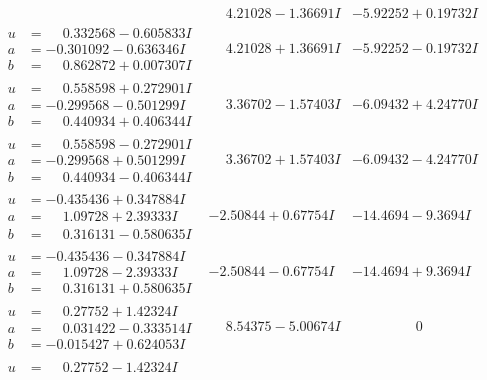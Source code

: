 \documentclass[1p]{elsarticle_modified}
\theoremstyle{definition}
\begin{document}
$$\begin{array}{c|c|c}
 & \phantom{-}4.21028 - 1.36691 I & -5.92252 + 0.19732 I \\ \hline\begin{aligned}
u &= \phantom{-}0.332568 - 0.605833 I \\
a &= -0.301092 - 0.636346 I \\
b &= \phantom{-}0.862872 + 0.007307 I\end{aligned}
 & \phantom{-}4.21028 + 1.36691 I & -5.92252 - 0.19732 I \\ \hline\begin{aligned}
u &= \phantom{-}0.558598 + 0.272901 I \\
a &= -0.299568 - 0.501299 I \\
b &= \phantom{-}0.440934 + 0.406344 I\end{aligned}
 & \phantom{-}3.36702 - 1.57403 I & -6.09432 + 4.24770 I \\ \hline\begin{aligned}
u &= \phantom{-}0.558598 - 0.272901 I \\
a &= -0.299568 + 0.501299 I \\
b &= \phantom{-}0.440934 - 0.406344 I\end{aligned}
 & \phantom{-}3.36702 + 1.57403 I & -6.09432 - 4.24770 I \\ \hline\begin{aligned}
u &= -0.435436 + 0.347884 I \\
a &= \phantom{-}1.09728 + 2.39333 I \\
b &= \phantom{-}0.316131 - 0.580635 I\end{aligned}
 & -2.50844 + 0.67754 I & -14.4694 - 9.3694 I \\ \hline\begin{aligned}
u &= -0.435436 - 0.347884 I \\
a &= \phantom{-}1.09728 - 2.39333 I \\
b &= \phantom{-}0.316131 + 0.580635 I\end{aligned}
 & -2.50844 - 0.67754 I & -14.4694 + 9.3694 I \\ \hline\begin{aligned}
u &= \phantom{-}0.27752 + 1.42324 I \\
a &= \phantom{-}0.031422 - 0.333514 I \\
b &= -0.015427 + 0.624053 I\end{aligned}
 & \phantom{-}8.54375 - 5.00674 I & \phantom{-0.000000 } 0 \\ \hline\begin{aligned}
u &= \phantom{-}0.27752 - 1.42324 I \\

\end{aligned}
\end{array}$$
\end{document}
